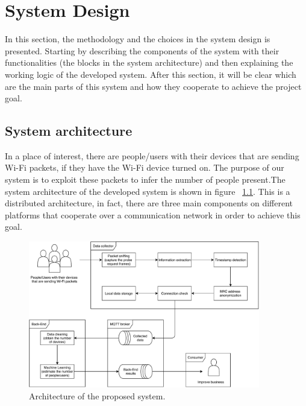 \chapter{System Design}
\label{cha:system}
\vspace{0.4 cm} 

In this section, the methodology and the choices in the system design is presented. Starting by describing the components of the system with their functionalities (the blocks in the system architecture) and then explaining the working logic of the developed system. After this section, it will be clear which are the main parts of this system and how they cooperate to achieve the project goal.


\section{System architecture}
\label{sec:sysarc}
\vspace{0.2 cm} 

In a place of interest, there are people/users with their devices that are sending Wi-Fi packets, if they have the Wi-Fi device turned on. The purpose of our system is to exploit these packets to infer the number of people present.The system architecture of the developed system is shown in figure ~\ref{fig:architecture}. 
This is a distributed architecture, in fact, there are three main components on different platforms that cooperate over a communication network in order to achieve this goal.

\begin{figure}[h]
\centering 
\includegraphics[width=0.9\textwidth]{images/architecture} 
\caption{Architecture of the proposed system.}
\label{fig:architecture}
\end{figure}

